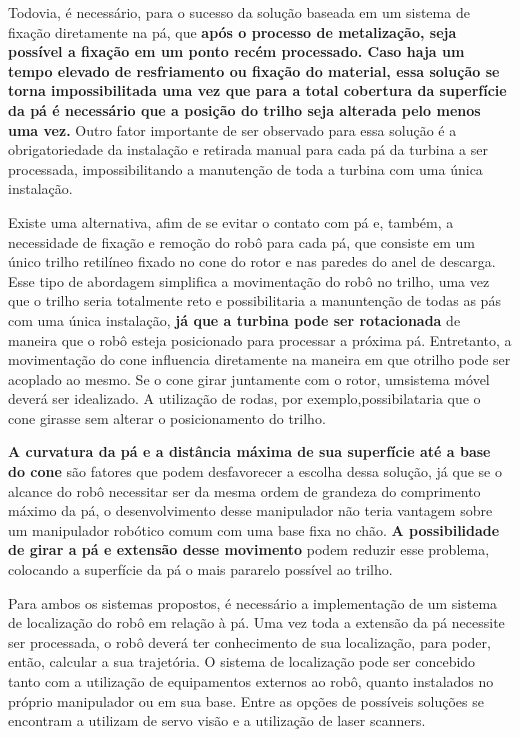 Todovia, é necessário, para o sucesso da solução baseada em um sistema de
fixação diretamente na pá, que \textbf{após o processo de metalização, seja 
possível a fixação em um ponto recém processado. Caso haja um tempo elevado de 
resfriamento ou fixação do material,
essa solução se torna impossibilitada uma vez que para a total cobertura da 
superfície da pá é necessário que a posição do trilho seja alterada pelo menos 
uma vez.} Outro fator importante de ser observado para essa solução é a
obrigatoriedade da instalação e retirada manual para cada pá da turbina a ser
processada, impossibilitando a manutenção de toda a turbina com uma única
instalação.

Existe uma alternativa, afim de se evitar o contato com pá e, também, a
necessidade de fixação e remoção do robô para cada pá, que consiste em um único trilho
retilíneo fixado no cone do rotor e nas paredes do anel de descarga. Esse tipo
de abordagem simplifica a movimentação do robô no trilho, uma vez que o trilho
seria totalmente reto e possibilitaria a manuntenção de todas as pás com uma
única instalação, \textbf{já que a turbina pode ser rotacionada} de maneira que o robô
esteja posicionado para processar a próxima pá. Entretanto, a movimentação do 
cone influencia diretamente na maneira em que otrilho pode ser acoplado ao 
mesmo. Se o cone girar juntamente com o rotor, umsistema móvel deverá ser 
idealizado. A utilização de rodas, por exemplo,possibilataria que o cone 
girasse sem alterar o posicionamento do trilho. 

\textbf{A curvatura da pá e a distância máxima de sua superfície até a base do
cone} são fatores que podem desfavorecer a escolha dessa solução, já que se o
alcance do robô necessitar ser da mesma ordem de grandeza do comprimento máximo
da pá, o desenvolvimento desse manipulador não teria vantagem sobre um
manipulador robótico comum com uma base fixa no chão. \textbf{A possibilidade
de girar a pá e extensão desse movimento} podem reduzir esse problema, colocando
a superfície da pá o mais pararelo possível ao trilho.

Para ambos os sistemas propostos, é necessário a implementação de um sistema de
localização do robô em relação à pá. Uma vez toda a extensão da pá necessite ser
processada, o robô deverá ter conhecimento de sua localização, para poder,
então, calcular a sua trajetória. O sistema de localização pode ser concebido
tanto com a utilização de equipamentos externos ao robô, quanto instalados no
próprio manipulador ou em sua base. Entre as opções de possíveis soluções se
encontram a utilizam de servo visão e a utilização de laser scanners.

